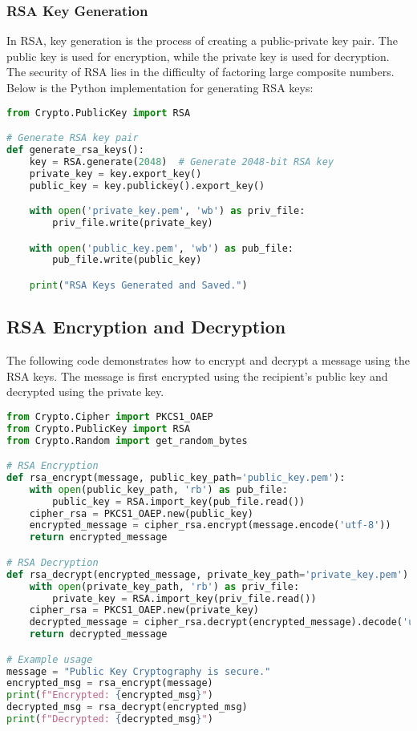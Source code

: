 \documentclass[12pt]{report}
\numberwithin{equation}{chapter}
\begin{document}
\subsubsection{RSA Key Generation}

In RSA, key generation is the process of creating a public-private key pair. The public key is used for encryption, while the private key is used for decryption. The security of RSA lies in the difficulty of factoring large composite numbers. Below is the Python implementation for generating RSA keys:

\begin{lstlisting}[language=Python]
from Crypto.PublicKey import RSA

# Generate RSA key pair
def generate_rsa_keys():
    key = RSA.generate(2048)  # Generate 2048-bit RSA key
    private_key = key.export_key()
    public_key = key.publickey().export_key()

    with open('private_key.pem', 'wb') as priv_file:
        priv_file.write(private_key)

    with open('public_key.pem', 'wb') as pub_file:
        pub_file.write(public_key)

    print("RSA Keys Generated and Saved.")
\end{lstlisting}

\subsection{RSA Encryption and Decryption}

The following code demonstrates how to encrypt and decrypt a message using the RSA keys. The message is first encrypted using the recipient’s public key and decrypted using the private key.

\begin{lstlisting}[language=Python]
from Crypto.Cipher import PKCS1_OAEP
from Crypto.PublicKey import RSA
from Crypto.Random import get_random_bytes

# RSA Encryption
def rsa_encrypt(message, public_key_path='public_key.pem'):
    with open(public_key_path, 'rb') as pub_file:
        public_key = RSA.import_key(pub_file.read())
    cipher_rsa = PKCS1_OAEP.new(public_key)
    encrypted_message = cipher_rsa.encrypt(message.encode('utf-8'))
    return encrypted_message

# RSA Decryption
def rsa_decrypt(encrypted_message, private_key_path='private_key.pem'):
    with open(private_key_path, 'rb') as priv_file:
        private_key = RSA.import_key(priv_file.read())
    cipher_rsa = PKCS1_OAEP.new(private_key)
    decrypted_message = cipher_rsa.decrypt(encrypted_message).decode('utf-8')
    return decrypted_message

# Example usage
message = "Public Key Cryptography is secure."
encrypted_msg = rsa_encrypt(message)
print(f"Encrypted: {encrypted_msg}")
decrypted_msg = rsa_decrypt(encrypted_msg)
print(f"Decrypted: {decrypted_msg}")
\end{lstlisting}
\end{document}
